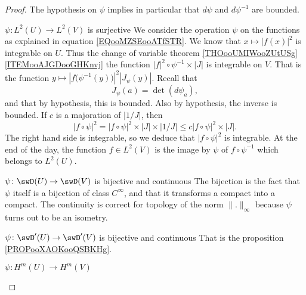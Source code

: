 \begin{proof}
    The hypothesis on \( \psi\) implies in particular that \( d\psi\) and \( d\psi^{-1}\) are bounded.
    \begin{subproof}
    \item[\( \psi\colon L^2(U)\to L^2(V)\) is surjective] 
        We consider the operation \( \psi\) on the functions as explained in equation \eqref{EQooMZSEooATfSTR}. We know that \( x\mapsto | f(x) |^2\) is integrable on \( U\). Thus the change of variable theorem \ref{THOooUMIWooZUtUSg}\ref{ITEMooAJGDooGHKnvj} the function \( | f |^2\circ\psi^{-1}\times | J |\) is integrable on \( V\). That is the function \( y\mapsto | f\big( \psi^{-1}(y) \big) |^2| J_{\psi}(y) |\). Recall that
        \begin{equation}
            J_{\psi}(a)=\det(d\psi_a),
        \end{equation}
        and that by hypothesis, this is bounded. Also by hypothesis, the inverse is bounded. If \( c\) is a majoration of \( | 1/J |\), then
        \begin{equation}
            | f\circ\psi |^2=| f\circ\psi |^2\times | J |\times | 1/J |\leq c| f\circ\psi |^2\times | J |.
        \end{equation}
        The right hand side is integrable, so we deduce that \( | f\circ\psi |^2\) is integrable. At the end of the day, the function \( f\in L^2(V)\) is the image by \( \psi\) of \( f\circ\psi^{-1}\) which belongs to \( L^2(U)\).

    \item[\( \psi\colon \swD(U)\to \swD(V)\) is bijective and continuous]
        The bijection is the fact that \( \psi\) itself is a bijection of class \(  C^{\infty}\), and that it transforms a compact into a compact. The continuity is correct for topology of the norm \( \| . \|_{\infty}\) because \( \psi\) turns out to be an isometry.

    \item[\( \psi\colon \swD'(U)\to \swD'(V)\) is bijective and continuous]
        That is the proposition \ref{PROPooXAOKooQSBKHg}.

    \item[\( \psi\colon H^m(U)\to H^m(V)\)]
        

\end{subproof}
\end{proof}
